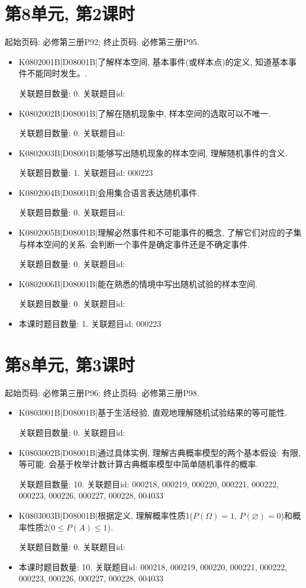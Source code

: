 \section*{第8单元, 第2课时}
起始页码: 必修第三册P92; 终止页码: 必修第三册P95.
\begin{itemize}
\item K0802001B|D08001B|了解样本空间, 基本事件(或样本点)的定义,  知道基本事件不能同时发生。.

关联题目数量: 0. 关联题目id: 

\item K0802002B|D08001B|了解在随机现象中, 样本空间的选取可以不唯一.

关联题目数量: 0. 关联题目id: 

\item K0802003B|D08001B|能够写出随机现象的样本空间, 理解随机事件的含义.

关联题目数量: 1. 关联题目id: 000223

\item K0802004B|D08001B|会用集合语言表达随机事件.

关联题目数量: 0. 关联题目id: 

\item K0802005B|D08001B|理解必然事件和不可能事件的概念, 了解它们对应的子集与样本空间的关系. 会判断一个事件是确定事件还是不确定事件.

关联题目数量: 0. 关联题目id: 

\item K0802006B|D08001B|能在熟悉的情境中写出随机试验的样本空间.

关联题目数量: 0. 关联题目id: 

\item 本课时题目数量: 1. 关联题目id: 000223

\end{itemize}

\section*{第8单元, 第3课时}
起始页码: 必修第三册P96; 终止页码: 必修第三册P98.
\begin{itemize}
\item K0803001B|D08001B|基于生活经验, 直观地理解随机试验结果的等可能性.

关联题目数量: 0. 关联题目id: 

\item K0803002B|D08001B|通过具体实例, 理解古典概率模型的两个基本假设: 有限, 等可能. 会基于枚举计数计算古典概率模型中简单随机事件的概率.

关联题目数量: 10. 关联题目id: 000218, 000219, 000220, 000221, 000222, 000223, 000226, 000227, 000228, 004033

\item K0803003B|D08001B|根据定义, 理解概率性质1($P(\Omega)=1$, $P(\varnothing)=0$)和概率性质2($0\le P(A)\le 1$).

关联题目数量: 0. 关联题目id: 

\item 本课时题目数量: 10. 关联题目id: 000218, 000219, 000220, 000221, 000222, 000223, 000226, 000227, 000228, 004033

\end{itemize}

